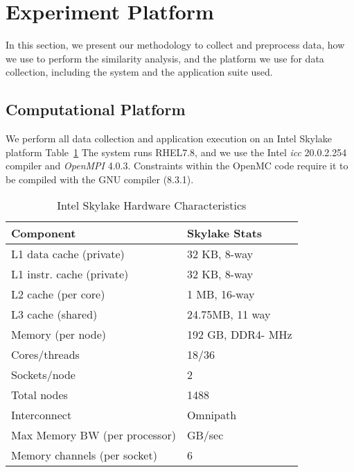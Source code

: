 \section{Experiment Platform}
\label{sec:expPlatform}
In this section, we present our methodology to collect and preprocess data, how we use \us to perform the similarity analysis, and the platform we use for data collection, including the system and the application suite used. 

\subsection{Computational Platform}
We perform all data collection and application execution on an Intel Skylake platform Table~\ref{tab:platformSpecs}  %
The system runs RHEL7.8, and we use the Intel \emph{icc} 20.0.2.254 compiler and \emph{OpenMPI} 4.0.3.  Constraints within the OpenMC code require it to be compiled with the GNU compiler (8.3.1). 

\begin{table}
   \begin{center}
      \caption{Intel Skylake Hardware Characteristics}
      \label{tab:platformSpecs}
    \footnotesize
      \begin{tabular}{ll} 
      \toprule
      \textbf{Component}                   & \textbf{Skylake Stats}           \\ 
      \midrule
      L1 data cache (private) & 32 KB, 8-way  \\ 
      L1 instr. cache (private) & 32 KB, 8-way\\ 
      L2 cache (per core)             & 1 MB, 16-way \\
      L3 cache (shared)     & 24.75MB, 11 way \\
      Memory (per node)        & 192 GB, DDR4- MHz         \\
      Cores/threads        & 18/36 \\ 
      Sockets/node         &  2 \\ 
      Total nodes          &1488 \\ 
      Interconnect  & Omnipath \\ 
      Max Memory BW (per processor)   &  GB/sec       \\ 
      Memory channels (per socket)            & 6           \\ 
      \bottomrule
      \end{tabular}
   \end{center}
\end{table}


